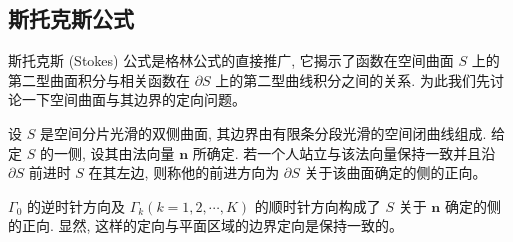 \documentclass[12pt,fontset=fandol]{ctexart}
\begin{document}
\subsection{斯托克斯公式}

斯托克斯 (Stokes) 公式是格林公式的直接推广, 它揭示了函数在空间曲面 $S$ 上的第二型曲面积分与相关函数在 $\partial S$ 上的第二型曲线积分之间的关系. 为此我们先讨论一下空间曲面与其边界的定向问题。

设 $S$ 是空间分片光滑的双侧曲面, 其边界由有限条分段光滑的空间闭曲线组成. 给定 $S$ 的一侧, 设其由法向量 $\boldsymbol n$ 所确定. 若一个人站立与该法向量保持一致并且沿 $\partial S$ 前进时 $S$ 在其左边, 则称他的前进方向为 $\partial S$ 关于该曲面确定的侧的正向。

$\Gamma_0$ 的逆时针方向及 $\Gamma_k(k=1,2,\cdots,K)$ 的顺时针方向构成了 $S$ 关于 $\boldsymbol n$ 确定的侧的正向. 显然, 这样的定向与平面区域的边界定向是保持一致的。
\end{document}
